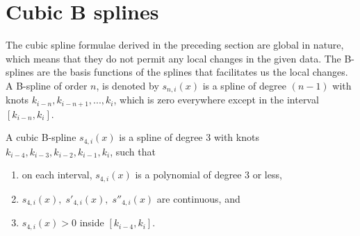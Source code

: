 \documentclass[aima203_lecturenotes_ku.tex]{subfiles}
\begin{document}
\section{Cubic B splines}
The cubic spline formulae derived in the preceding section are global in nature, which means that they do not permit any local changes in the given data. The B-splines are the basis functions of the splines that facilitates us the local changes. \\
A B-spline of order $n$, is denoted by $s_{n,i}(x)$ is a spline of degree $(n-1)$ with knots $k_{i-n}, k_{i-n+1},...,k_i$, which is zero everywhere except in the interval $[k_{i-n}, k_i]$.
\begin{definition}
  A cubic B-spline $s_{4,i}(x)$ is a spline of degree $3$ with knots $k_{i-4}, k_{i-3},k_{i-2},k_{i-1},k_i$, such that
  \begin{enumerate}
  \item on each interval, $s_{4,i}(x)$ is a polynomial of degree $3$ or less,
  \item $s_{4,i}(x), \; s'_{4,i}(x), \; s''_{4,i}(x)$ are continuous, and
   \item $s_{4,i}(x) > 0$ inside $[k_{i-4}, k_i]$.
  \end{enumerate}
\end{definition}
\end{document}
